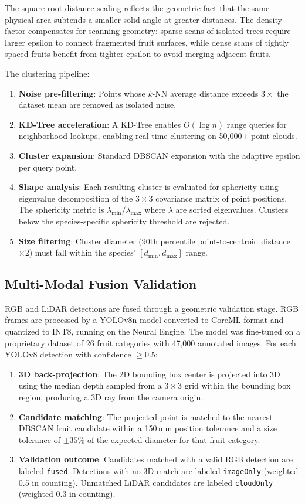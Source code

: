 \documentclass[12pt,a4paper]{article}
\begin{document}
The square-root distance scaling reflects the geometric fact that the same physical area subtends a smaller solid angle at greater distances. The density factor compensates for scanning geometry: sparse scans of isolated trees require larger epsilon to connect fragmented fruit surfaces, while dense scans of tightly spaced fruits benefit from tighter epsilon to avoid merging adjacent fruits.

The clustering pipeline:
\begin{enumerate}
  \item \textbf{Noise pre-filtering}: Points whose $k$-NN average distance exceeds $3\times$ the dataset mean are removed as isolated noise.
  \item \textbf{KD-Tree acceleration}: A KD-Tree enables $O(\log n)$ range queries for neighborhood lookups, enabling real-time clustering on 50,000+ point clouds.
  \item \textbf{Cluster expansion}: Standard DBSCAN expansion with the adaptive epsilon per query point.
  \item \textbf{Shape analysis}: Each resulting cluster is evaluated for sphericity using eigenvalue decomposition of the $3\times3$ covariance matrix of point positions. The sphericity metric is $\lambda_{\min} / \lambda_{\max}$ where $\lambda$ are sorted eigenvalues. Clusters below the species-specific sphericity threshold are rejected.
  \item \textbf{Size filtering}: Cluster diameter (90th percentile point-to-centroid distance $\times 2$) must fall within the species' $[d_{\min}, d_{\max}]$ range.
\end{enumerate}

\subsection{Multi-Modal Fusion Validation}

RGB and LiDAR detections are fused through a geometric validation stage. RGB frames are processed by a YOLOv8n model converted to CoreML format and quantized to INT8, running on the Neural Engine. The model was fine-tuned on a proprietary dataset of 26 fruit categories with 47,000 annotated images. For each YOLOv8 detection with confidence $\ge 0.5$:

\begin{enumerate}
  \item \textbf{3D back-projection}: The 2D bounding box center is projected into 3D using the median depth sampled from a $3\times3$ grid within the bounding box region, producing a 3D ray from the camera origin.
  \item \textbf{Candidate matching}: The projected point is matched to the nearest DBSCAN fruit candidate within a 150\,mm position tolerance and a size tolerance of $\pm35\%$ of the expected diameter for that fruit category.
  \item \textbf{Validation outcome}: Candidates matched with a valid RGB detection are labeled \texttt{fused}. Detections with no 3D match are labeled \texttt{imageOnly} (weighted 0.5 in counting). Unmatched LiDAR candidates are labeled \texttt{cloudOnly} (weighted 0.3 in counting).
\end{enumerate}
\end{document}
